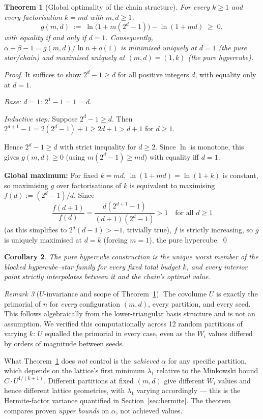 \documentclass[12pt]{article}
\newtheorem{theorem}{Theorem}[section]
\newtheorem{corollary}[theorem]{Corollary}
\theoremstyle{remark}
\newtheorem{remark}[theorem]{Remark}
\begin{document}
\begin{theorem}[Global optimality of the chain structure]
\label{thm:global}
For every $k \ge 1$ and every factorisation $k = md$ with $m, d \ge 1$,
\[
  g(m,d) \;:=\; \ln\bigl(1 + m(2^d - 1)\bigr) - \ln(1 + md) \;\ge\; 0,
\]
with equality if and only if $d = 1$.  Consequently,
$\alpha + \beta - 1 = g(m,d)/\ln n + o(1)$ is minimised uniquely at $d=1$ (the
pure star/chain) and maximised uniquely at $(m,d) = (1,k)$ (the pure hypercube).
\end{theorem}

\begin{proof}
It suffices to show $2^d - 1 \ge d$ for all positive integers $d$, with equality
only at $d = 1$.

\textit{Base:} $d=1$: $2^1 - 1 = 1 = d$. \checkmark

\textit{Inductive step:} Suppose $2^d - 1 \ge d$.  Then
$2^{d+1} - 1 = 2(2^d - 1) + 1 \ge 2d + 1 > d + 1$ for $d \ge 1$.

Hence $2^d - 1 \ge d$ with strict inequality for $d \ge 2$.  Since $\ln$ is
monotone, this gives $g(m,d) \ge 0$ (using $m(2^d-1) \ge md$) with equality
iff $d = 1$.

\textbf{Global maximum:}  For fixed $k = md$, $\ln(1+md) = \ln(1+k)$ is
constant, so maximising $g$ over factorisations of $k$ is equivalent to
maximising $f(d) := (2^d-1)/d$.  Since
\[
  \frac{f(d+1)}{f(d)}
  = \frac{d(2^{d+1}-1)}{(d+1)(2^d-1)} > 1
  \quad \text{for all } d \ge 1
\]
(as this simplifies to $2^d(d-1) > -1$, trivially true), $f$ is strictly
increasing, so $g$ is uniquely maximised at $d = k$ (forcing $m=1$), the pure
hypercube.  \qed
\end{proof}

\begin{corollary}
The pure hypercube construction is the unique \emph{worst} member of the
blocked hypercube--star family for every fixed total budget $k$, and every
interior point strictly interpolates between it and the chain's optimal value.
\end{corollary}

\begin{remark}[$U$-invariance and scope of Theorem~\ref{thm:global}]
The covolume $U$ is exactly the primorial of $n$ for \emph{every} configuration
$(m,d)$, every partition, and every seed.  This follows algebraically from the
lower-triangular basis structure and is not an assumption.  We verified this
computationally across 12 random partitions of varying $k$: $U$ equalled the
primorial in every case, even as the $W_i$ values differed by orders of
magnitude between seeds.

What Theorem~\ref{thm:global} does \emph{not} control is the \emph{achieved}
$\alpha$ for any specific partition, which depends on the lattice's first minimum
$\lambda_1$ relative to the Minkowski bound $C \cdot U^{1/(k+1)}$.  Different
partitions at fixed $(m,d)$ give different $W_i$ values and hence different
lattice geometries, with $\lambda_1$ varying accordingly --- this is the
Hermite-factor variance quantified in Section~\ref{sec:hermite}.  The theorem
compares proven \emph{upper bounds} on $\alpha$, not achieved values.
\end{remark}
\end{document}
